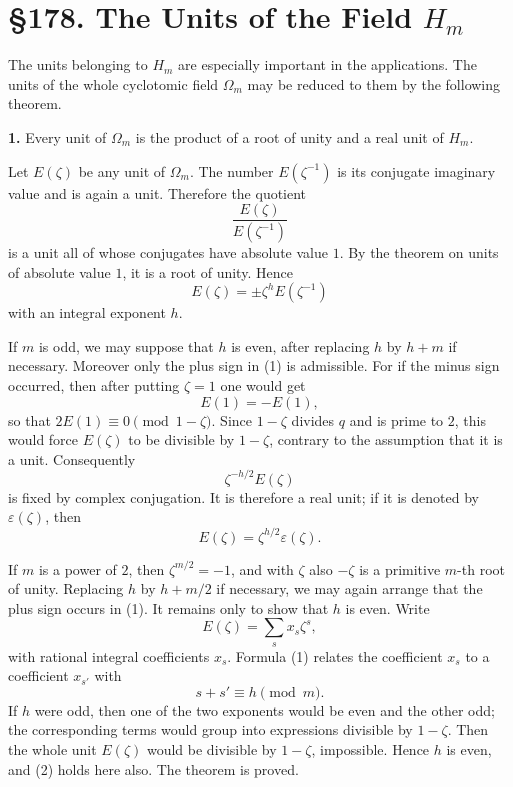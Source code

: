 \documentclass[12pt,a4paper]{article}
\newcommand{\webersection}[2]{\clearpage\section*{\S #1. #2}}
\newcommand{\Om}{\Omega_m}
\newcommand{\Hm}{H_m}
\newcommand{\zetaS}{\zeta}
\begin{document}
\webersection{178}{The Units of the Field \(\Hm\)}

The units belonging to \(\Hm\) are especially important in the applications.  The units of the whole cyclotomic field \(\Om\) may be reduced to them by the following theorem.

\textbf{1.} Every unit of \(\Om\) is the product of a root of unity and a real unit of \(\Hm\).

Let \(E(\zetaS)\) be any unit of \(\Om\).  The number \(E(\zetaS^{-1})\) is its conjugate imaginary value and is again a unit.  Therefore the quotient
\[
  \frac{E(\zetaS)}{E(\zetaS^{-1})}
\]
is a unit all of whose conjugates have absolute value \(1\).  By the theorem on units of absolute value \(1\), it is a root of unity.  Hence
\[
  E(\zetaS)=\pm \zetaS^h E(\zetaS^{-1})
\tag{1}
\]
with an integral exponent \(h\).

If \(m\) is odd, we may suppose that \(h\) is even, after replacing \(h\) by \(h+m\) if necessary.  Moreover only the plus sign in (1) is admissible.  For if the minus sign occurred, then after putting \(\zetaS=1\) one would get
\[
  E(1)=-E(1),
\]
so that \(2E(1)\equiv0\pmod{1-\zetaS}\).  Since \(1-\zetaS\) divides \(q\) and is prime to \(2\), this would force \(E(\zetaS)\) to be divisible by \(1-\zetaS\), contrary to the assumption that it is a unit.  Consequently
\[
  \zetaS^{-h/2}E(\zetaS)
\]
is fixed by complex conjugation.  It is therefore a real unit; if it is denoted by \(\varepsilon(\zetaS)\), then
\[
  E(\zetaS)=\zetaS^{h/2}\varepsilon(\zetaS).
\tag{2}
\]

If \(m\) is a power of \(2\), then \(\zetaS^{m/2}=-1\), and with \(\zetaS\) also \(-\zetaS\) is a primitive \(m\)-th root of unity.  Replacing \(h\) by \(h+m/2\) if necessary, we may again arrange that the plus sign occurs in (1).  It remains only to show that \(h\) is even.  Write
\[
  E(\zetaS)=\sum_s x_s\zetaS^s,
\tag{3}
\]
with rational integral coefficients \(x_s\).  Formula (1) relates the coefficient \(x_s\) to a coefficient \(x_{s'}\) with
\[
  s+s'\equiv h\pmod m.
\]
If \(h\) were odd, then one of the two exponents would be even and the other odd; the corresponding terms would group into expressions divisible by \(1-\zetaS\).  Then the whole unit \(E(\zetaS)\) would be divisible by \(1-\zetaS\), impossible.  Hence \(h\) is even, and (2) holds here also.  The theorem is proved.
\end{document}
